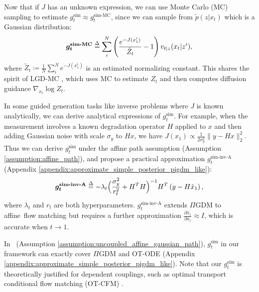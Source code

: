 Now that if $J$ has an unknown expression, we can use Monte Carlo (MC) sampling to estimate $g_t^{\text{sim}}\approx g_t^{\text{sim-MC}}$, since we can sample from $\tilde{p}(z|x_t)$ which is a Gaussian distribution:
\vspace{-5pt}
\begin{equation}
\vspace{-5pt}
    \bm{g_t}^{\textbf{sim-MC}} \defg \sum_i^N \left(\frac{e^{-J(x_1^i)}}{\tilde{Z}_t} - 1\right) v_{t|z}(x_t|z^i),
\end{equation}
where $\tilde{Z}_t\coloneqq \frac{1}{N} \sum_i^N e^{-J(x_1^i)} $ is an estimated normalizing constant. This shares the spirit of LGD-MC \citep{song_loss-guided_2023}, which uses MC to estimate $Z_t$ and then computes diffusion guidance $\nabla_{x_t}\log Z_t$.

In some guided generation tasks like inverse problems where $J$ is known analytically, we can derive analytical expressions of $g_t^{\text{sim}}$. For example, when the measurement involves a known degradation operator $H$ applied to $x$ and then adding Gaussian noise with scale $\sigma_y$ to $Hx$, we have $J(x_1) \propto \frac{1}{2\sigma_y^2}\|y - Hx\|_2^2$. Thus we can derive $g_t^{\text{sim}}$ under the affine path assumption (Assumption \ref{assumption:affine_path}), and propose a practical approximation $g_t^{\text{sim-inv-A}}$ (Appendix \ref{appendix:approximate_simple_posterior_pigdm_like}):
\vspace{-5pt}
\begin{equation}
\vspace{-5pt}
    \bm{g_t}^{\textbf{sim-inv-A}} \defg -\lambda_t \Big{(}\frac{\sigma_y^2}{r_t^2} + H^TH\Big{)}^{-1}
    H^T\left(y - {H} \hat{x}_1\right),
\end{equation}
where $\lambda_t$ and $r_t$ are both hyperparameters. $g_t^{\text{sim-inv-A}}$ extends $\Pi$GDM \cite{song_pseudoinverse-guided_2022} to affine~flow matching but requires a further approximation $\frac{\partial \hat{x}_1}{\partial x_t}\approx I$, which is accurate when $t\rightarrow 1$.


In \diffusionpath~(Assumption \ref{assumption:uncoupled_affine_gaussian_path}), $g_t^{\text{sim}}$ in our framework can exactly cover $\Pi$GDM and OT-ODE \citep{song_pseudoinverse-guided_2022,pokle_training-free_2024}
(Appendix \ref{appendix:approximate_simple_posterior_pigdm_like}). 
Note that our $g_t^{\text{sim}}$ is theoretically justified for dependent couplings, such as optimal transport conditional flow matching (OT-CFM) \citep{tong_improving_2024}.

